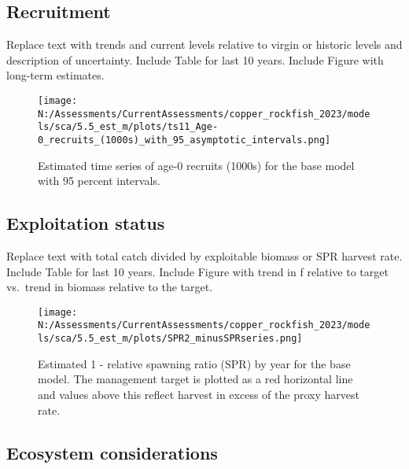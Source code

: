 \documentclass[11pt,
  english,
  letterpaper,
]{article}
\begin{document}
\hypertarget{recruitment}{%
\subsection*{Recruitment}\label{recruitment}}

Replace text with trends and current levels relative to virgin or historic levels and description of uncertainty. Include Table for last 10 years. Include Figure with long-term estimates.



\begin{figure}
\centering
\texttt{[image: N:/Assessments/CurrentAssessments/copper\_rockfish\_2023/models/sca/5.5\_est\_m/plots/ts11\_Age-0\_recruits\_(1000s)\_with\_95\_asymptotic\_intervals.png]}
\caption{Estimated time series of age-0 recruits (1000s) for the base model with 95 percent intervals.\label{fig:es-recruits}}
\end{figure}

\clearpage

\hypertarget{exploitation-status}{%
\subsection*{Exploitation status}\label{exploitation-status}}

Replace text with total catch divided by exploitable biomass or SPR harvest rate. Include Table for last 10 years. Include Figure with trend in f relative to target vs.~trend in biomass relative to the target.



\begin{figure}
\centering
\texttt{[image: N:/Assessments/CurrentAssessments/copper\_rockfish\_2023/models/sca/5.5\_est\_m/plots/SPR2\_minusSPRseries.png]}
\caption{Estimated 1 - relative spawning ratio (SPR) by year for the base model. The management target is plotted as a red horizontal line and values above this reflect harvest in excess of the proxy harvest rate.\label{fig:es-1-spr}}
\end{figure}

\hypertarget{ecosystem-considerations}{%
\subsection*{Ecosystem considerations}\label{ecosystem-considerations}}
\end{document}
